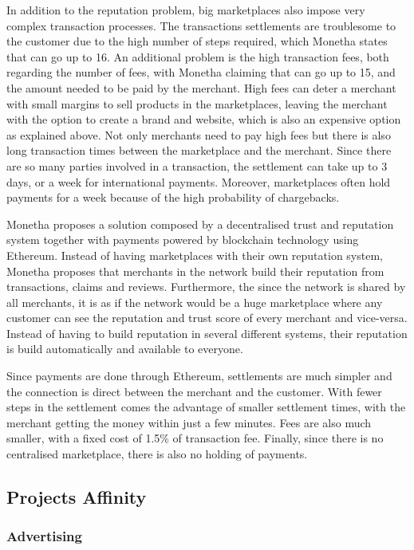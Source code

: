 \medskip

In addition to the reputation problem, big marketplaces also impose very complex transaction processes. The transactions settlements are troublesome to the customer due to the high number of steps required, which Monetha states that can go up to 16. An additional problem is the high transaction fees, both regarding the number of fees, with Monetha claiming that can go up to 15, and the amount needed to be paid by the merchant. High fees can deter a merchant with small margins to sell products in the marketplaces, leaving the merchant with the option to create a brand and website, which is also an expensive option as explained above. Not only merchants need to pay high fees but there is also long transaction times between the marketplace and the merchant. Since there are so many parties involved in a transaction, the settlement can take up to 3 days, or a week for international payments. Moreover, marketplaces often hold payments for a week because of the high probability of chargebacks.

\medskip

Monetha proposes a solution composed by a decentralised trust and reputation system together with payments powered by blockchain technology using Ethereum. Instead of having marketplaces with their own reputation system, Monetha proposes that merchants in the network build their reputation from transactions, claims and reviews. Furthermore, the since the network is shared by all merchants, it is as if the network would be a huge marketplace where any customer can see the reputation and trust score of every merchant and vice-versa. Instead of having to build reputation in several different systems, their reputation is build automatically and available to everyone.

Since payments are done through Ethereum, settlements are much simpler and the connection is direct between the merchant and the customer. With fewer steps in the settlement comes the advantage of smaller settlement times, with the merchant getting the money within just a few minutes. Fees are also much smaller, with a fixed cost of 1.5\% of transaction fee. Finally, since there is no centralised marketplace, there is also no holding of payments.

\subsection{Projects Affinity}

\subsubsection{Advertising}

